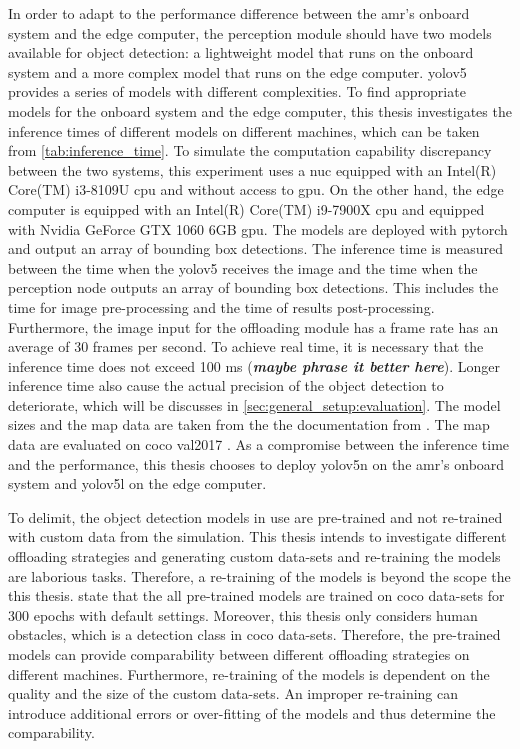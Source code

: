 In order to adapt to the performance difference between the \gls{amr}'s onboard system and the edge computer, the perception module should have two models available for object detection: a lightweight model that runs on the onboard system and a more complex model that runs on the edge computer. \gls{yolov5} provides a series of models with different complexities. To find appropriate models for the onboard system and the edge computer, this thesis investigates the inference times of different models on different machines, which can be taken from \cref{tab:inference_time}. To simulate the computation capability discrepancy between the two systems, this experiment uses a \gls{nuc} equipped with an Intel(R) Core(TM) i3-8109U \gls{cpu} and without access to \gls{gpu}. On the other hand, the edge computer is equipped with an Intel(R) Core(TM) i9-7900X \gls{cpu} and equipped with Nvidia GeForce GTX 1060 6GB \gls{gpu}. The models are deployed with \gls{pytorch} and output an array of bounding box detections. The inference time is measured between the time when the \gls{yolov5} receives the image and the time when the perception node outputs an array of bounding box detections. This includes the time for image pre-processing and the time of results post-processing. Furthermore, the image input for the offloading module has a frame rate has an average of 30 frames per second. To achieve real time, it is necessary that the inference time does not exceed 100 ms (\textbf{\textit{maybe phrase it better here}}). Longer inference time also cause the actual precision of the object detection to deteriorate, which will be discusses in \cref{sec:general_setup:evaluation}. The model sizes and the \gls{map} data are taken from the the documentation from \citeauthor*{Jocher2022} \cite{Jocher2022}. The \gls{map} data are evaluated on \gls{coco} val2017 \cite{Lin2014}. As a compromise between the inference time and the performance, this thesis chooses to deploy \gls{yolov5}n on the \gls{amr}'s onboard system and \gls{yolov5}l on the edge computer. 

To delimit, the object detection models in use are pre-trained and not re-trained with custom data from the simulation. This thesis intends to investigate different offloading strategies and generating custom data-sets and re-training the models are laborious tasks. Therefore, a re-training of the models is beyond the scope the this thesis. \citeauthor*{Jocher2022} \cite{Jocher2022} state that the all pre-trained models are trained on \gls{coco} data-sets for 300 epochs with default settings. Moreover, this thesis only considers human obstacles, which is a detection class in \gls{coco} data-sets. Therefore, the pre-trained models can provide comparability between different offloading strategies on different machines. Furthermore, re-training of the models is dependent on the quality and the size of the custom data-sets. An improper re-training can introduce additional errors or over-fitting of the models and thus determine the comparability. 

